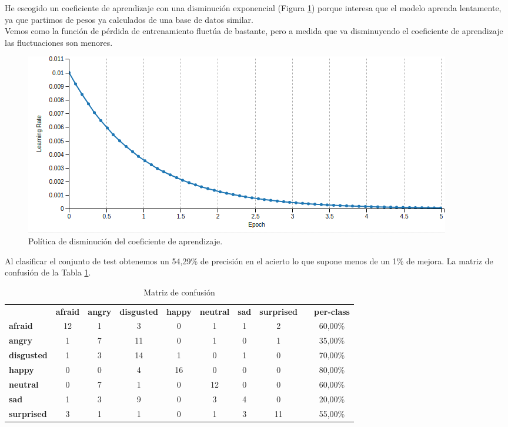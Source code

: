 \documentclass[a4paper,11pt]{book}
\begin{document}
He escogido un coeficiente de aprendizaje con una disminución exponencial (Figura \ref{fig:entrenamiento5results1}) porque interesa que el modelo aprenda lentamente, ya que partimos de pesos ya calculados de una base de datos similar.\\
Vemos como la función de pérdida de entrenamiento fluctúa de bastante, pero a medida que va disminuyendo el coeficiente de aprendizaje las fluctuaciones son menores.\\
\begin{figure}[h]
	\centering
	\includegraphics[width=0.9\linewidth]{imagenes/entrenamiento5results1}
	\caption[Resultados del entrenamiento 5]{Política de disminución del coeficiente de aprendizaje.}
	\label{fig:entrenamiento5results1}
\end{figure}

Al clasificar el conjunto de test obtenemos un 54,29\% de precisión en el acierto lo que supone menos de un 1\% de mejora. La matriz de confusión de la Tabla \ref{tab:entrenamiento5MC}.
\begin{table}[h]
	\centering
	\small
	\setlength\tabcolsep{3pt}
	\setlength\extrarowheight{2pt}
	\begin{tabular}{lccccccclc}
		& \multicolumn{1}{l}{\textbf{afraid}} & \multicolumn{1}{l}{\textbf{angry}} & \multicolumn{1}{l}{\textbf{disgusted}} & \multicolumn{1}{l}{\textbf{happy}} & \multicolumn{1}{l}{\textbf{neutral}} & \multicolumn{1}{l}{\textbf{sad}} & \multicolumn{1}{l}{\textbf{surprised}} &  & \multicolumn{1}{l}{\textbf{per-class}} \\
		\textbf{afraid}    & \cellcolor[HTML]{EFEFEF}12 & 1	& 3 & 0 & 1 & 1 & 2 &  & 60,00\% \\
		\textbf{angry}     & 1 & \cellcolor[HTML]{EFEFEF}7 & 11 & 0 & 1 & 0 & 1 &  & 35,00\% \\
		\textbf{disgusted} & 1 & 3 & \cellcolor[HTML]{EFEFEF}14 & 1 & 0 & 1 & 0 &  & 70,00\% \\
		\textbf{happy}     & 0 & 0 & 4 & \cellcolor[HTML]{EFEFEF}16 & 0 & 0 & 0 &  & 80,00\% \\
		\textbf{neutral}   & 0 & 7 & 1 & 0 & \cellcolor[HTML]{EFEFEF}12 & 0 & 0 &  & 60,00\% \\
		\textbf{sad}       & 1 & 3 & 9 & 0 & 3 & \cellcolor[HTML]{EFEFEF}4 & 0 &  & 20,00\% \\
		\textbf{surprised} & 3 & 1 & 1 & 0 & 1 & 3 & \cellcolor[HTML]{EFEFEF}11 &  & 55,00\%
	\end{tabular}
	\caption{Matriz de confusión}
	\label{tab:entrenamiento5MC}
\end{table}
\end{document}
